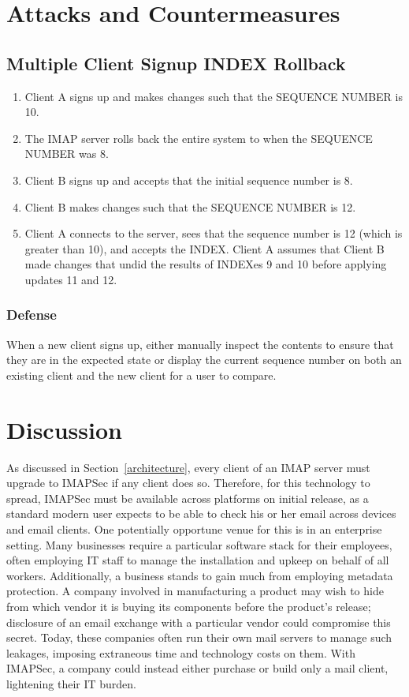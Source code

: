 \documentclass[pageno]{jpaper}
\newcommand{\project}{IMAPSec }
\newcommand{\projectnospace}{IMAPSec}
\begin{document}
\section{Attacks and Countermeasures}
\subsection{Multiple Client Signup INDEX Rollback}
\begin{enumerate}
\item Client A signs up and makes changes such that the SEQUENCE NUMBER is 10.
\item The IMAP server rolls back the entire system to when the SEQUENCE NUMBER was 8.
\item Client B signs up and accepts that the initial sequence number is 8.
\item Client B makes changes such that the SEQUENCE NUMBER is 12.
\item Client A connects to the server, sees that the sequence number is 12 (which is greater than 10), and accepts the INDEX. Client A assumes that Client B made changes that undid the results of INDEXes 9 and 10 before applying updates 11 and 12.
\end{enumerate}

\subsubsection{Defense}
When a new client signs up, either manually inspect the contents to ensure that they are in the expected state or display the current sequence number on both an existing client and the new client for a user to compare.

\section{Discussion}
As discussed in Section~\ref{architecture}, every client of an IMAP server must upgrade to \project if any client does so. Therefore, for this technology to spread, \project must be available across platforms on initial release, as a standard modern user expects to be able to check his or her email across devices and email clients. One potentially opportune venue for this is in an enterprise setting. Many businesses require a particular software stack for their employees, often employing IT staff to manage the installation and upkeep on behalf of all workers. Additionally, a business stands to gain much from employing metadata protection. A company involved in manufacturing a product may wish to hide from which vendor it is buying its components before the product's release; disclosure of an email exchange with a particular vendor could compromise this secret. Today, these companies often run their own mail servers to manage such leakages, imposing extraneous time and technology costs on them. With \projectnospace, a company could instead either purchase or build only a mail client, lightening their IT burden.
\end{document}
